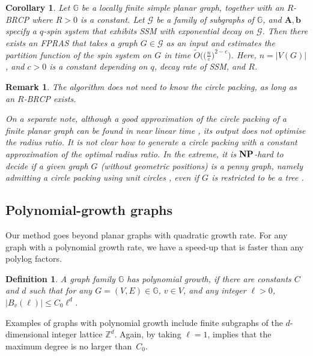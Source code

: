 \documentclass[10pt,a4paper]{article}
\newtheorem{corollary}{Corollary}[section]
\newtheorem{definition}{Definition}[section]
\newtheorem{remark}{Remark}[section]
\def\+#1{\mathcal{#1}}
\def\=#1{\mathbb{#1}}
\newcommand{\abs}[1]{\ensuremath{\left\vert#1\right\vert}}
\newcommand{\eps}{\varepsilon}
\newcommand{\NP}{\textnormal{\textbf{NP}}}
\begin{document}
\begin{corollary}\label{cor:BRCP}
  Let $\mathbb{G}$ be a locally finite simple planar graph, together with an $R$-BRCP where $R>0$ is a constant. 
Let $\+{G}$ be a family of subgraphs of $\mathbb{G}$,
and ${\mathbf{A}}, {\mathbf{b}}$ specify a $q$-spin system that exhibits SSM with exponential decay on $\mathcal{G}$. 
Then there exists an FPRAS that takes a graph $G\in\mathcal{G}$ as an input and estimates the partition function of the spin system on $G$ in time $\widetilde{O}\big(\big(\frac{n}{\eps}\big)^{2-c}\big)$. 
Here, $n=|V(G)|$, and $c>0$ is a constant depending on $q$, decay rate of SSM, and $R$. 
\end{corollary}

\begin{remark}
  The algorithm does not need to know the circle packing,
  as long as an $R$-BRCP exists.

  On a separate note, although a good approximation of the circle packing of a finite planar graph can be found in near linear time \cite{DLQ20}, 
  its output does not optimise the radius ratio.
  It is not clear how to generate a circle packing with a constant approximation of the optimal radius ratio. 
  In the extreme, it is $\NP$-hard to decide if a given graph $G$ (without geometric positions) is a penny graph, namely admitting a circle packing using unit circles \cite{EW96}, even if $G$ is restricted to be a tree \cite{BDLRST15}. 
\end{remark}

\subsection{Polynomial-growth graphs} \label{sec:poly-growth}

Our method goes beyond planar graphs with quadratic growth rate.
For any graph with a polynomial growth rate, we have a speed-up that is faster than any polylog factors.

\begin{definition}  \label{def:poly-growth}
  A graph family $\=G$ has \emph{polynomial growth},
  if there are constants $C$ and $d$ such that for any $G=(V,E)\in\=G$, $v\in V$, and any integer $\ell>0$,
  $\abs{B_v(\ell)}\le C_0\ell^d$.
\end{definition}

Examples of graphs with polynomial growth include finite subgraphs of the $d$-dimensional integer lattice $\=Z^d$.
Again, by taking $\ell=1$,  implies that the maximum degree is no larger than~$C_0$.
\end{document}
